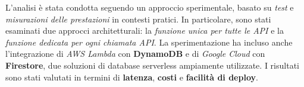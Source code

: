 L'analisi è stata condotta seguendo un approccio sperimentale, basato su \textit{test} e \textit{misurazioni delle prestazioni} in contesti pratici. In particolare, sono stati esaminati due approcci architetturali: la \textit{funzione unica per tutte le API} e la \textit{funzione dedicata per ogni chiamata API}. La sperimentazione ha incluso anche l’integrazione di \textit{AWS Lambda} con \textbf{DynamoDB} e di \textit{Google Cloud} con \textbf{Firestore}, due soluzioni di database serverless ampiamente utilizzate. I risultati sono stati valutati in termini di \textbf{latenza}, \textbf{costi} e \textbf{facilità di deploy}.
